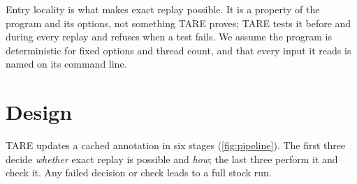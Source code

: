 \documentclass[letterpaper,twocolumn,10pt]{article}
\theoremstyle{definition}
\newcommand{\sys}{TARE\xspace}
\begin{document}
Entry locality is what makes exact replay possible. It is a property of the program and its options, not something
\sys proves; \sys tests it before and during every replay and refuses when a test fails. We assume the program is
deterministic for fixed options and thread count, and that every input it reads is named on its command line.

\section{Design}
\label{sec:design}

\sys updates a cached annotation in six stages (\cref{fig:pipeline}). The first three decide \textit{whether} exact
replay is possible and \textit{how}; the last three perform it and check it. Any failed decision or check leads to a
full stock run.
\end{document}
